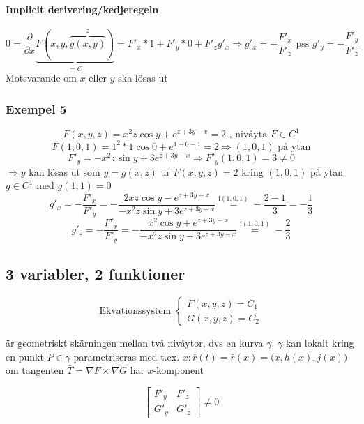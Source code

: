 \documentclass{article}
\begin{document}
\paragraph{Implicit derivering/kedjeregeln}

\[
	0 = \frac{\partial}{\partial x} \underbrace{F(x,y,\overbrace{g(x,y)}^z)}_{=C} = F'_x * 1 + F'_y * 0 + F'_zg'_x \Rightarrow g'_x = - \frac{F'_x}{F'_z} \text{ pss } g'_y = - \frac{F'_y}{F'_z}
\]
Motsvarande om \(x\) eller \(y\) ska lösas ut

\subsubsection{Exempel 5}
\begin{equation} \label{eq:8.7}
	F(x,y,z) = x^2z\cos{y} + e^{z + 3y - x} = 2 \text{ , nivåyta } F \in C^1
\end{equation}
\[
	F(1,0,1) = 1^2 * 1\cos{0} + e ^{1+0-1} = 2 \Rightarrow (1,0,1) \text{ på ytan}
\]
\[
	F'_y = - x^2z\sin{y} + 3e^{z+3y-x} \Rightarrow F'_y(1,0,1) = 3 \neq 0
\]
\(\Rightarrow y\) kan lösas ut som \(y = g(x,z)\) ur \(F(x,y,z) = 2\) kring \((1,0,1)\) på ytan \(g \in C^1\) med \(g(1,1) = 0\)
\[
	g'_x = - \frac{F'_x}{F'_y} = - \frac{2xz\cos{y} - e^{z+3y-x}}{- x^2z\sin{y} + 3e^{z+3y-x}} \overset{\mathrm{i (1,0,1)}}{=} - \frac{2-1}{3} = - \frac{1}{3}
\]
\[
	g'_z = - \frac{F'_x}{F'_y} = - \frac{x^2\cos{y} + e^{z+3y-x}}{- x^2z\sin{y} + 3e^{z+3y-x}} \overset{\mathrm{i (1,0,1)}}{=} - \frac{2}{3}
\]

\subsection{3 variabler, 2 funktioner}

\[
\text{Ekvationssystem }
\left\{\begin{array}{rcl}
	F(x,y,z) = C_1 \\
	G(x,y,z) = C_2
\end{array}\right.
\]

är geometriskt skärningen mellan två nivåytor, dvs en kurva \(\gamma\). \newline
\(\gamma\) kan lokalt kring en punkt \(P \in \gamma\) parametriseras med t.ex. \(x: \bar{r}(t) = \bar{r}(x) = \Big(x,h(x),j(x)\Big)\) om tangenten \newline
\(\bar{T} = \nabla F \times \nabla G\) har \(x\)-komponent

\[\begin{bmatrix}
	F'_y & F'_z \\
	G'_y & G'_z
\end{bmatrix}\neq 0\]
\end{document}
